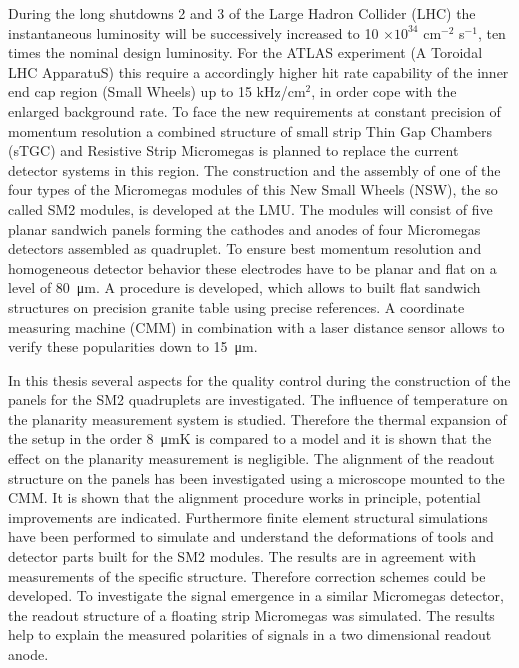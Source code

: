 \documentclass[
a4paper,                                %
twoside,                                %
BCOR1.4cm,                      %
10pt,                           %
headings=normal,                %
headsepline,                    %
clearplainpage, %
final,                                  %
div=14,
parskip=full,
openright,
bibliography=toc
]{scrreprt}
\begin{document}
During the long shutdowns 2 and 3 of the Large Hadron Collider (LHC) the instantaneous luminosity will be successively increased to 10 $\times 10^{34}$ cm$^{-2}$ s$^{-1}$, ten times the nominal design luminosity. For the ATLAS experiment (A Toroidal LHC ApparatuS) this require a accordingly higher hit rate capability of the inner end cap region (Small Wheels) up to 15 kHz/cm$^{2}$, in order cope with the enlarged background rate. To face the new requirements at constant precision of momentum resolution a combined structure of small strip Thin Gap Chambers (sTGC) and Resistive Strip Micromegas is planned to replace the current detector systems in this region. The construction and the assembly of one of the four types of the Micromegas modules of this New Small Wheels (NSW), the so called SM2 modules, is developed at the LMU. The modules will consist of five planar sandwich panels forming the cathodes and anodes of four Micromegas detectors assembled as quadruplet. To ensure best momentum resolution and homogeneous detector behavior these electrodes have to be planar and flat on a level of \SI{80}{\micro\m}. A procedure is developed, which allows to built flat sandwich structures on precision granite table using precise references. A coordinate measuring machine (CMM) in combination with a laser distance sensor allows to verify these popularities down to \SI{15}{\micro\m}. 

In this thesis several aspects for the quality control during the construction of the panels for the SM2 quadruplets are investigated. The influence of temperature on the planarity measurement system is studied. Therefore the thermal expansion of the setup in the order \SI{8}{\micro\m}K is compared to a model and it is shown that the effect on the planarity measurement is negligible. The alignment of the readout structure on the panels has been investigated using a microscope mounted to the CMM. It is shown that the alignment procedure works in principle, potential improvements are indicated. Furthermore finite element structural simulations have been performed to simulate and understand the deformations of tools and detector parts built for the SM2 modules. The results are in agreement with measurements of the specific structure. Therefore correction schemes could be developed.
To investigate the signal emergence in a similar Micromegas detector, the readout structure of a floating strip Micromegas was simulated. The results help to explain the measured polarities of signals in a two dimensional readout anode.
\end{document}
